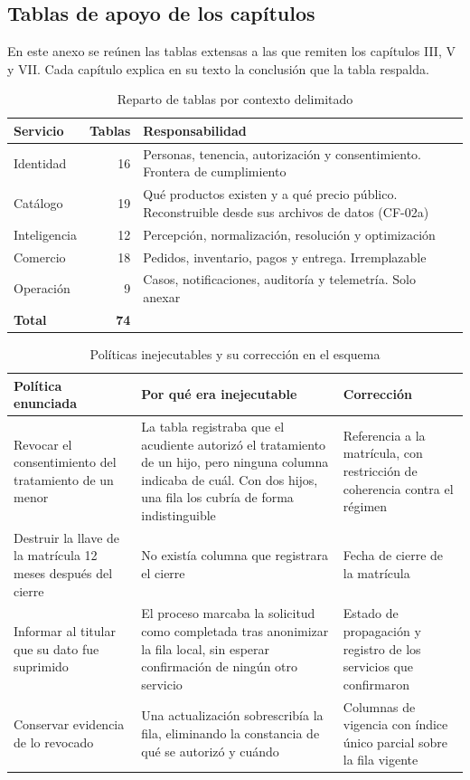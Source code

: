 \subsection{Tablas de apoyo de los capítulos}
\label{anx:tablas}

En este anexo se reúnen las tablas extensas a las que remiten los capítulos III, V y VII. Cada capítulo explica en su texto la conclusión que la tabla respalda.

\begin{table}[htbp]
\centering
\caption{Reparto de tablas por contexto delimitado}
\label{tab:reparto}
\small
\begin{tabular}{@{}lrp{8.4cm}@{}}
\toprule
\textbf{Servicio} & \textbf{Tablas} & \textbf{Responsabilidad} \\
\midrule
Identidad     & 16 & Personas, tenencia, autorización y consentimiento. Frontera de cumplimiento \\
Catálogo      & 19 & Qué productos existen y a qué precio público. Reconstruible desde sus archivos de datos (CF-02a) \\
Inteligencia  & 12 & Percepción, normalización, resolución y optimización \\
Comercio      & 18 & Pedidos, inventario, pagos y entrega. Irremplazable \\
Operación     & 9  & Casos, notificaciones, auditoría y telemetría. Solo anexar \\
\midrule
\textbf{Total} & \textbf{74} & \\
\bottomrule
\end{tabular}
\end{table}

\begin{table}[htbp]
\centering
\caption{Políticas inejecutables y su corrección en el esquema}
\label{tab:politicas}
\small
\begin{tabular}{@{}p{4.3cm}p{5.0cm}p{4.4cm}@{}}
\toprule
\textbf{Política enunciada} & \textbf{Por qué era inejecutable} & \textbf{Corrección} \\
\midrule
Revocar el consentimiento del tratamiento de un menor &
La tabla registraba que el acudiente autorizó el tratamiento de un hijo, pero ninguna
columna indicaba de cuál. Con dos hijos, una fila los cubría de forma indistinguible &
Referencia a la matrícula, con restricción de coherencia contra el régimen \\
\addlinespace
Destruir la llave de la matrícula 12 meses después del cierre &
No existía columna que registrara el cierre &
Fecha de cierre de la matrícula \\
\addlinespace
Informar al titular que su dato fue suprimido &
El proceso marcaba la solicitud como completada tras anonimizar la fila local, sin esperar
confirmación de ningún otro servicio &
Estado de propagación y registro de los servicios que confirmaron \\
\addlinespace
Conservar evidencia de lo revocado &
Una actualización sobrescribía la fila, eliminando la constancia de qué se autorizó y
cuándo &
Columnas de vigencia con índice único parcial sobre la fila vigente \\
\bottomrule
\end{tabular}
\end{table}

